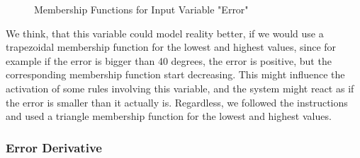 \documentclass[12pt]{article}
\begin{document}
\begin{figure}[H]
    \centering
    \caption{Membership Functions for Input Variable "Error"}
\end{figure}

We think, that this variable could model reality better, if we would use a trapezoidal membership function for the lowest and highest values, since for example if the error is bigger than 40 degrees, the error is positive, but the corresponding membership function start decreasing. This might influence the activation of some rules involving this variable, and the system might react as if the error is smaller than it actually is. Regardless, we followed the instructions and used a triangle membership function for the lowest and highest values.

\subsubsection{Error Derivative}
\end{document}
